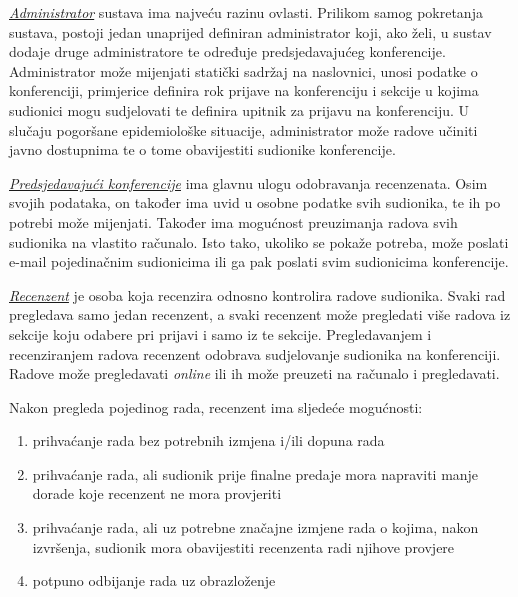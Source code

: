 		\underline{\textit{Administrator}} sustava ima najveću razinu ovlasti. Prilikom samog pokretanja sustava, postoji jedan unaprijed definiran administrator koji, ako želi, u sustav dodaje druge administratore te određuje predsjedavajućeg konferencije. Administrator može mijenjati statički sadržaj na naslovnici, unosi podatke o konferenciji, primjerice definira rok prijave na konferenciju i sekcije u kojima sudionici mogu sudjelovati te definira upitnik za prijavu na konferenciju. U slučaju pogoršane epidemiološke situacije, administrator može radove učiniti javno dostupnima te o tome obavijestiti sudionike konferencije.
		
		
		\underline{\textit{Predsjedavajući konferencije}} ima glavnu ulogu odobravanja recenzenata. Osim svojih podataka, on također ima uvid u osobne podatke svih sudionika, te ih po potrebi može mijenjati. Također ima mogućnost preuzimanja radova svih sudionika na vlastito računalo. Isto tako, ukoliko se pokaže potreba, može poslati e-mail pojedinačnim sudionicima ili ga pak poslati svim sudionicima konferencije. 
		
		
		\underline{\textit{Recenzent}} je osoba koja recenzira odnosno kontrolira radove sudionika. Svaki rad pregledava samo jedan recenzent, a svaki recenzent može pregledati više radova iz sekcije koju odabere pri prijavi i samo iz te sekcije. Pregledavanjem i recenziranjem radova recenzent odobrava sudjelovanje sudionika na konferenciji. Radove može pregledavati \textit{online} ili ih može preuzeti na računalo i pregledavati. 
		
		Nakon pregleda pojedinog rada, recenzent ima sljedeće mogućnosti:
		
		\begin{enumerate}
			
			\item prihvaćanje rada bez potrebnih izmjena i/ili dopuna rada
			\item prihvaćanje rada, ali sudionik prije finalne predaje mora napraviti manje dorade koje recenzent ne mora provjeriti
			\item prihvaćanje rada, ali uz potrebne značajne izmjene rada o kojima, nakon izvršenja, sudionik mora obavijestiti recenzenta radi njihove provjere
			\item potpuno odbijanje rada uz obrazloženje
			
		\end{enumerate}
	
